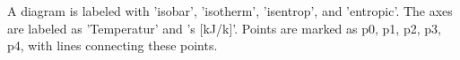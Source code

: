A diagram is labeled with 'isobar', 'isotherm', 'isentrop', and 'entropic'. The axes are labeled as 'Temperatur' and 's [kJ/k]'. Points are marked as p0, p1, p2, p3, p4, with lines connecting these points.